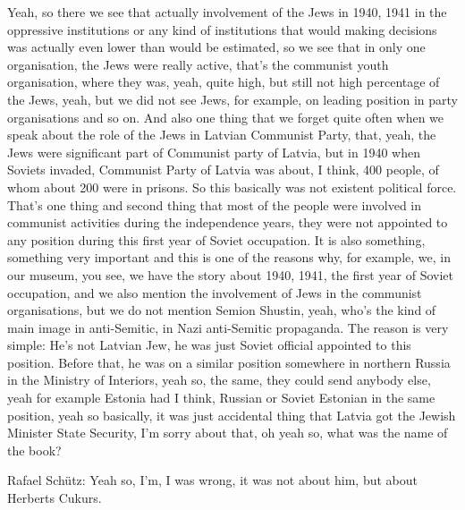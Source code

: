 Yeah, so there we see that actually involvement of the Jews in 1940, 1941 in the oppressive institutions or any kind of institutions that would making decisions was actually even lower than would be estimated, so we see that in only one organisation, the Jews were really active, that’s the communist youth organisation, where they was, yeah, quite high, but still not high percentage of the Jews, yeah, but we did not see Jews, for example, on leading position in party organisations and so on. And also one thing that we forget quite often when we speak about the role of the Jews in Latvian Communist Party, that, yeah, the Jews were significant part of Communist party of Latvia, but in 1940 when Soviets invaded, Communist Party of Latvia was about, I think, 400 people, of whom about 200 were in prisons. So this basically was not existent political force. That’s one thing and second thing that most of the people were involved in communist activities during the independence years, they were not appointed to any position during this first year of Soviet occupation. It is also something, something very important and this is one of the reasons why, for example, we, in our museum, you see, we have the story about 1940, 1941, the first year of Soviet occupation, and we also mention the involvement of Jews in the communist organisations, but we do not mention Semion Shustin, yeah, who’s the kind of main image in anti-Semitic, in Nazi anti-Semitic propaganda. The reason is very simple: He’s not Latvian Jew, he was just Soviet official appointed to this position. Before that, he was on a similar position somewhere in northern Russia in the Ministry of Interiors, yeah so, the same, they could send anybody else, yeah for example Estonia had I think, Russian or Soviet Estonian in the same position, yeah so basically, it was just accidental thing that Latvia got the Jewish Minister State Security, I’m sorry about that, oh yeah so, what was the name of the book? 

Rafael Schütz: Yeah so, I’m, I was wrong, it was not about him, but about Herberts Cukurs. 

